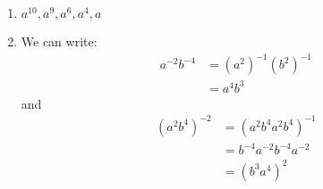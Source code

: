 \begin{sol}
    \begin{enumerate}
        \item $a^{10}, a^9, a^6, a^4, a$
        \item We can write:
        \begin{align}
            a^{-2}b^{-4} &= (a^2)^{-1}(b^2)^{-1} \\ 
            &= a^4b^3
        \end{align}
        and
        \begin{align}
            (a^2b^4)^{-2} &= (a^2b^4a^2b^4)^{-1} \\ 
            &= b^{-4}a^{-2}b^{-4}a^{-2} \\ 
            &= (b^3a^4)^2
        \end{align}
    \end{enumerate}
\end{sol}